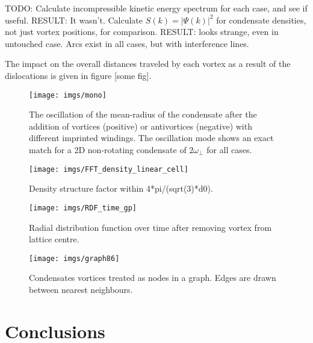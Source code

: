 TODO:
Calculate incompressible kinetic energy spectrum for each case, and see if useful. RESULT: It wasn't.
Calculate $S(k) = |\Psi(k)|^2$ for condensate densities, not just vortex positions, for comparison. RESULT: looks strange, even in untouched
case. Arcs exist in all cases, but with interference lines.

The impact on the overall distances traveled by each vortex as a result of the dislocations is given in figure [some fig].

\begin{figure}[tb]
	\texttt{[image: imgs/mono]}
	\caption{The oscillation of the mean-radius of the condensate after the addition of vortices (positive) or antivortices (negative) with
	different imprinted windings. The oscillation mode shows an exact match for a 2D non-rotating condensate of $2\omega_{\perp}$ for all cases.}
\end{figure}

\begin{figure}[tb]
	\texttt{[image: imgs/FFT\_density\_linear\_cell]}
	\caption{Density structure factor within 4*pi/(sqrt(3)*d0).}
\end{figure}


\begin{figure}[tb]
	\texttt{[image: imgs/RDF\_time\_gp]}
	\caption{Radial distribution function over time after removing vortex from lattice centre. }
\end{figure}


\begin{figure}[tb]
	\texttt{[image: imgs/graph86]}
	\caption{Condensates vortices treated as nodes in a graph. Edges are drawn between nearest neighbours.}
\end{figure}
\section{Conclusions}\label{sec:conc}

